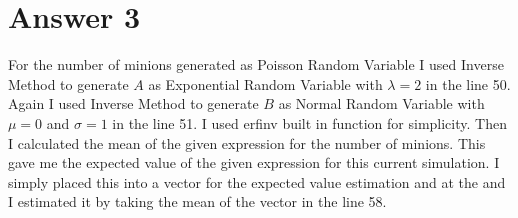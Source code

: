 \documentclass[12pt]{article}
\begin{document}
\section*{Answer 3}
For the number of minions generated as Poisson Random Variable I used Inverse Method to generate $A$ as Exponential Random Variable with $\lambda=2$ in the line 50. Again I used Inverse Method to generate $B$ as Normal Random Variable with $\mu=0$ and $\sigma=1$ in the line 51. I used erfinv built in function for simplicity. Then I calculated the mean of the given expression  for the number of minions. This gave me the expected value of the given expression for this current simulation. I simply placed this into a vector for the expected value estimation and at the and I estimated it by taking the mean of the vector in the line 58.
\end{document}
